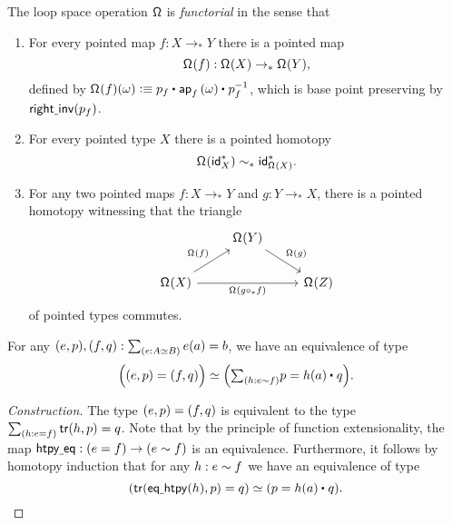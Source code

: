 \begin{defn}
The loop space operation $\mathsf{\Omega}$ is \emph{functorial} in the sense that
\begin{enumerate}
\item For every pointed map $f:X\to_\ast Y$ there is a pointed map
\begin{equation*}
\mathsf{\Omega}^{}(f):\mathsf{\Omega}^{}(X)\to_\ast \mathsf{\Omega}^{}(Y),
\end{equation*}
defined by $\loopspace{f}(\omega)\defeq \ct{p_f}{\ap{f}{\omega}}{p_f^{-1}}$, which is base point preserving by $\mathsf{right\underline{\ }{}inv}(p_f)$. 
\item For every pointed type $X$ there is a pointed homotopy
\begin{equation*}
\mathsf{\Omega}^{}(\mathsf{id}_X^\ast)\sim_\ast \mathsf{id}^\ast_{\mathsf{\Omega}^{}(X)}.
\end{equation*}
\item For any two pointed maps $f:X\to_\ast Y$ and $g:Y\to_\ast X$, there is a pointed homotopy witnessing that the triangle
\begin{equation*}
\begin{tikzcd}
& \loopspace{Y} \arrow[dr,"\loopspace{g}"] \\
\loopspace{X} \arrow[rr,swap,"\loopspace{g\circ_\ast f}"] \arrow[ur,"\loopspace{f}"] & & \loopspace{Z}
\end{tikzcd}
\end{equation*}
of pointed types commutes.
\end{enumerate}
\end{defn}

\begin{lem}\label{lem:equiv_of_ptdequiv}
For any $\pairr{e,p},\pairr{f,q}:\sm{e:\eqv{A}{B}}e(a)=b$, we have an equivalence of type
\begin{equation*}
\eqv{\Big(\pairr{e,p}=\pairr{f,q}\Big)}{\Big(\sm{h:e\htpy f} p=\ct{h(a)}{q}\Big)}.
\end{equation*}
\end{lem}

\begin{proof}[Construction]
The type ${\mathopen{}(e,p)\mathclose{}}={\mathopen{}(f,q)\mathclose{}}$ is equivalent
to the type $\sm{h:e=f}\tr({h},{p})=q$.
Note that by the principle of function extensionality,
the map $\mathsf{htpy\underline{\ }{}eq}:(e=f)\to(e\sim f)$
is an equivalence. Furthermore, it follows by homotopy induction that for any 
$h:e\sim f$ we have an equivalence of type
\begin{equation*}
\eqv{(\tr({\eqhtpy(h)},{p})=q)}
    {(p= \ct{h(a)}{q})}.\qedhere
\end{equation*}
\end{proof}

